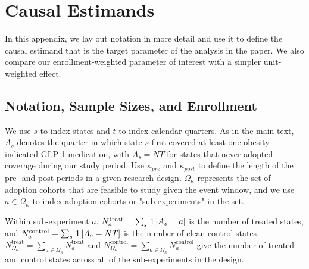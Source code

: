 \section{Causal Estimands}

In this appendix, we lay out notation in more detail and use it to define the causal estimand that is the target parameter of the analysis in the paper. We also compare our enrollment-weighted parameter of interest with a simpler unit-weighted effect.

\subsection{Notation, Sample Sizes, and Enrollment}

We use $s$ to index states and $t$ to index calendar quarters. As in the main text, $A_s$ denotes the quarter in which state $s$ first covered at least one obesity-indicated GLP-1 medication, with $A_s = NT$ for states that never adopted coverage during our study period. Use $\kappa_{pre}$ and $\kappa_{post}$ to define the length of the pre- and post-periods in a given research design. $\Omega_{\kappa}$ represents the set of adoption cohorts that are feasible to study given the event window, and we use $a \in \Omega_{\kappa}$ to index adoption cohorts or "sub-experiments" in the set.

Within sub-experiment $a$, $N_a^{\text{treat}} = \sum_{s}\one{A_s = a}$ is the number of treated states, and $N_a^{\text{control}} = \sum_s \one{A_s = NT}$ is the number of clean control states. $N_{\Omega_{\kappa}}^{\text{treat}} = \sum_{a\in\Omega_{\kappa}} N_a^{\text{treat}}$ and $N_{\Omega_{\kappa}}^{\text{control}} = \sum_{a\in\Omega_{\kappa}} N_a^{\text{control}}$ give the number of treated and control states across all of the sub-experiments in the design.

